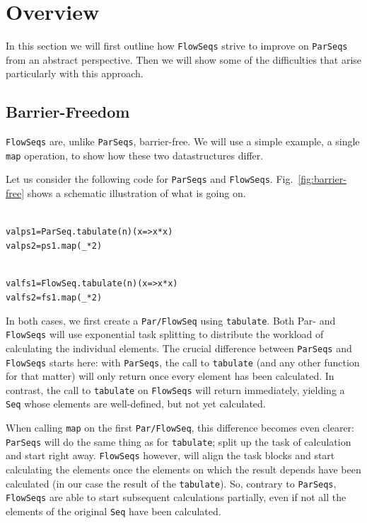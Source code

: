\documentclass[runningheads,a4paper,fleqn]{llncs}
\begin{document}
\section{Overview}
\label{sec:overview}

In this section we will first outline how \texttt{FlowSeqs} strive to improve
on \texttt{ParSeqs} from an abstract perspective. Then we will show some of
the difficulties that arise particularly with this approach.

\subsection{Barrier-Freedom}
\texttt{FlowSeqs} are, unlike \texttt{ParSeqs}, barrier-free. We will use a simple
example, a single \texttt{map} operation, to show how these two
datastructures differ.

Let us consider the following code for \texttt{ParSeqs} and
\texttt{FlowSeqs}. Fig.~\ref{fig:barrier-free} shows a schematic
illustration of what is going on.

\noindent
\begin{minipage}[t]{.49\textwidth}
\begin{alltt}
{\scriptsize
val ps1 = ParSeq.tabulate(n)(x => x*x)
val ps2 = ps1.map(_ * 2)
}
\end{alltt}
\end{minipage}
\begin{minipage}[t]{.49\textwidth}
\begin{alltt}
{\scriptsize
val fs1 = FlowSeq.tabulate(n)(x => x*x)
val fs2 = fs1.map(_ * 2)
}
\end{alltt}
\end{minipage}

In both cases, we first create a \texttt{Par/FlowSeq} using
\texttt{tabulate}. Both Par- and \texttt{FlowSeqs} will use exponential task
splitting \cite{collect11,cong08} to distribute the workload of
calculating the individual elements. The crucial difference between
\texttt{ParSeqs} and \texttt{FlowSeqs} starts here: with \texttt{ParSeqs}, the call to
\texttt{tabulate} (and any other function for that matter) will only
return once every element has been calculated. In contrast, the call
to \texttt{tabulate} on \texttt{FlowSeqs} will return immediately, yielding
a \texttt{Seq} whose elements are well-defined, but not yet calculated.

When calling \texttt{map} on the first \texttt{Par/FlowSeq}, this difference
becomes even clearer: \texttt{ParSeqs} will do the same thing as for
\texttt{tabulate}; split up the task of calculation and start right
away. \texttt{FlowSeqs} however, will align the task blocks and start
calculating the elements once the elements on which the result depends have
been calculated (in our case the result of the \texttt{tabulate}). So,
contrary to \texttt{ParSeqs}, \texttt{FlowSeqs} are able to start subsequent
calculations partially, even if not all the elements of the original
\texttt{Seq} have been calculated.
\end{document}

